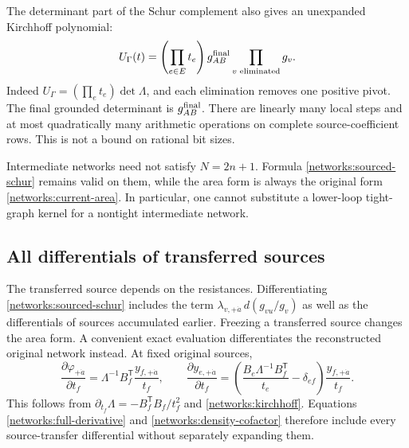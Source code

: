 The determinant part of the Schur complement also gives an unexpanded
Kirchhoff polynomial:
\begin{equation}
 U_\Gamma(t)
 =\left(\prod_{e\in E}t_e\right)g_{AB}^{\rm final}
       \prod_{v\text{ eliminated}}g_v.
 \label{networks:pivot-U}
\end{equation}
Indeed $U_\Gamma=(\prod_e t_e)\det\Lambda$, and each elimination removes
one positive pivot.  The final grounded determinant is
$g_{AB}^{\rm final}$.  There are linearly many local steps and at most
quadratically many arithmetic operations on complete source-coefficient
rows.  This is not a bound on rational bit sizes.

Intermediate networks need not satisfy $N=2n+1$.  Formula
\eqref{networks:sourced-schur} remains valid on them, while the area form
is always the original form \eqref{networks:current-area}.  In particular,
one cannot substitute a lower-loop tight-graph kernel for a nontight
intermediate network.

\subsection{All differentials of transferred sources}
\label{networks:differentials}

The transferred source depends on the resistances.  Differentiating
\eqref{networks:sourced-schur} includes the term
$\lambda_{v,+\dot a}\,d(g_{vu}/g_v)$ as well as the differentials of
sources accumulated earlier.  Freezing a transferred source changes the
area form.  A convenient exact evaluation differentiates the reconstructed
original network instead.  At fixed original sources,
\begin{equation}
 \frac{\partial\varphi_{+\dot a}}{\partial t_f}
 =\Lambda^{-1}B_f^{\mathsf T}\frac{y_{f,+\dot a}}{t_f},\qquad
 \boxed{
 \frac{\partial y_{e,+\dot a}}{\partial t_f}
 =\left(\frac{B_e\Lambda^{-1}B_f^{\mathsf T}}{t_e}
                  -\delta_{ef}\right)\frac{y_{f,+\dot a}}{t_f}.}
 \label{networks:full-derivative}
\end{equation}
This follows from
$\partial_{t_f}\Lambda=-B_f^{\mathsf T}B_f/t_f^2$ and
\eqref{networks:kirchhoff}.  Equations
\eqref{networks:full-derivative} and \eqref{networks:density-cofactor}
therefore include every source-transfer differential without separately
expanding them.

